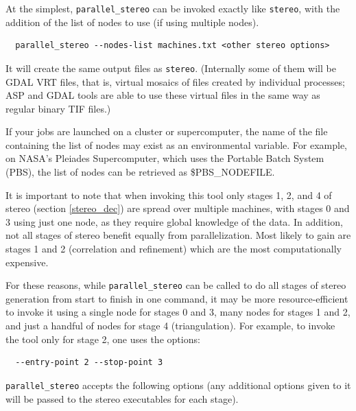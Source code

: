 At the simplest, \texttt{parallel\_stereo} can be invoked exactly like \texttt{stereo},
with the addition of the list of nodes to use (if using multiple nodes).

\begin{verbatim}
  parallel_stereo --nodes-list machines.txt <other stereo options>
\end{verbatim}

It will create the same output files as \texttt{stereo}. (Internally
some of them will be GDAL VRT files, that is, virtual mosaics of files created
by individual processes; ASP and GDAL tools are able to use these
virtual files in the same way as regular binary TIF files.)

If your jobs are launched on a cluster or supercomputer, the name of the
file containing the list of nodes may exist as an environmental
variable. For example, on NASA's Pleiades Supercomputer, which uses the
Portable Batch System (PBS), the list of nodes can be retrieved as
\$PBS\_NODEFILE.

It is important to note that when invoking this tool only stages 1, 2,
and 4 of stereo (section \ref{stereo_dec}) are spread over multiple
machines, with stages 0 and 3 using just one node, as they require
global knowledge of the data. In addition, not all stages of stereo
benefit equally from parallelization. Most likely to gain are stages 1
and 2 (correlation and refinement) which are the most computationally
expensive.

For these reasons, while \texttt{parallel\_stereo} can be called to do
all stages of stereo generation from start to finish in one command, it
may be more resource-efficient to invoke it using a single node for
stages 0 and 3, many nodes for stages 1 and 2, and just a handful of
nodes for stage 4 (triangulation). For example, to invoke the tool
only for stage 2, one uses the options:

\begin{verbatim}
  --entry-point 2 --stop-point 3
\end{verbatim}

\texttt{parallel\_stereo} accepts the following options (any additional
options given to it will be passed to the stereo executables
for each stage).

